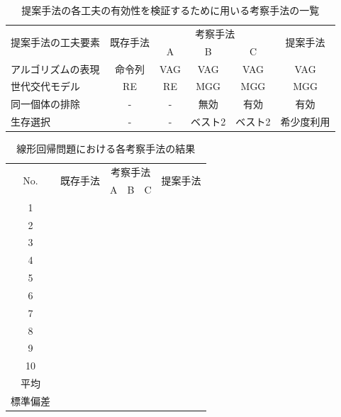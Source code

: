 \documentclass[11pt,oneside,openany,report]{jsbook}
\begin{document}
\begin{table}[tbp]
  \caption{提案手法の各工夫の有効性を検証するために用いる考察手法の一覧}
  \label{table:consideration_mehods}
  \centering
  \begin{tabular}{|l|c|ccc|c|}
    \hline
    \multirow{2}{*}{提案手法の工夫要素} & \multirow{2}{*}{既存手法} &\multicolumn{3}{|c|}{考察手法} & \multirow{2}{*}{提案手法} \\
    & & A & B & C & \\
    \hline
    \hline
    アルゴリズムの表現 & 命令列 & VAG & VAG  & VAG & VAG \\
    世代交代モデル    & RE    & RE   & MGG & MGG & MGG \\
    同一個体の排除      & -     & -    & 無効 & 有効 & 有効 \\
    生存選択          & -     & -   & ベスト2  & ベスト2 & 希少度利用 \\
    \hline
  \end{tabular}
\end{table}

\begin{table}[tbp]
  \caption{線形回帰問題における各考察手法の結果}
  \label{table:exp:result:aggregation:linear_regression}
  \centering
  \begin{tabular}{|c|c|ccc|c|}
    \hline
    \multirow{2}{*}{No. } & \multirow{2}{*}{既存手法} & \multicolumn{3}{|c|}{考察手法} & \multirow{2}{*}{提案手法}  \\
    & & A & B & C & \\
    \hline \hline
    1       &   &  &  &  &  \\
    2       &   &  &  &  &  \\
    3       &   &  &  &  &  \\
    4       &   &  &  &  &  \\
    5       &   &  &  &  &  \\
    6       &   &  &  &  &  \\
    7       &   &  &  &  &  \\
    8       &   &  &  &  &  \\
    9       &   &  &  &  &  \\
    10      &   &  &  &  &  \\
    \hline
    平均 & & & & & \\
    標準偏差 & & & & & \\
    \hline
  \end{tabular}
\end{table}
\end{document}
